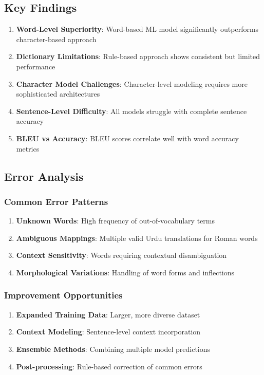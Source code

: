 \documentclass[10pt,twocolumn]{article}
\begin{document}
\subsection{Key Findings}
\begin{enumerate}[label=\arabic*.]
    \item \textbf{Word-Level Superiority}: Word-based ML model significantly outperforms character-based approach
    \item \textbf{Dictionary Limitations}: Rule-based approach shows consistent but limited performance
    \item \textbf{Character Model Challenges}: Character-level modeling requires more sophisticated architectures
    \item \textbf{Sentence-Level Difficulty}: All models struggle with complete sentence accuracy
    \item \textbf{BLEU vs Accuracy}: BLEU scores correlate well with word accuracy metrics
\end{enumerate}

\subsection{Error Analysis}

\subsubsection*{Common Error Patterns}
\begin{enumerate}[label=\arabic*.]
    \item \textbf{Unknown Words}: High frequency of out-of-vocabulary terms
    \item \textbf{Ambiguous Mappings}: Multiple valid Urdu translations for Roman words
    \item \textbf{Context Sensitivity}: Words requiring contextual disambiguation
    \item \textbf{Morphological Variations}: Handling of word forms and inflections
\end{enumerate}

\subsubsection*{Improvement Opportunities}
\begin{enumerate}[label=\arabic*.]
    \item \textbf{Expanded Training Data}: Larger, more diverse dataset
    \item \textbf{Context Modeling}: Sentence-level context incorporation
    \item \textbf{Ensemble Methods}: Combining multiple model predictions
    \item \textbf{Post-processing}: Rule-based correction of common errors
\end{enumerate}
\end{document}
